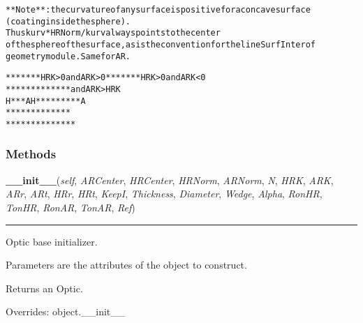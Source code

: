 \begin{alltt}
**Note**: the curvature of any surface is positive for a concave surface
(coating inside the sphere).
Thus kurv*HRNorm/{\textbar}kurv{\textbar} always points to the center
of the sphere of the surface, as is the convention for the lineSurfInter of
geometry module. Same for AR.

*******     HRK {\textgreater} 0 and ARK {\textgreater} 0     *******           HRK {\textgreater} 0 and ARK {\textless} 0
 *****                               ********         and {\textbar}ARK{\textbar} {\textgreater} {\textbar}HRK{\textbar}
 H***A                               H*********A
 *****                               ********
*******                             *******
\end{alltt}



  \subsubsection{Methods}

    \vspace{0.5ex}

\hspace{.8\funcindent}\begin{boxedminipage}{\funcwidth}

    \raggedright \textbf{\_\_init\_\_}(\textit{self}, \textit{ARCenter}, \textit{HRCenter}, \textit{HRNorm}, \textit{ARNorm}, \textit{N}, \textit{HRK}, \textit{ARK}, \textit{ARr}, \textit{ARt}, \textit{HRr}, \textit{HRt}, \textit{KeepI}, \textit{Thickness}, \textit{Diameter}, \textit{Wedge}, \textit{Alpha}, \textit{RonHR}, \textit{TonHR}, \textit{RonAR}, \textit{TonAR}, \textit{Ref})

    \vspace{-1.5ex}

    \rule{\textwidth}{0.5\fboxrule}
\setlength{\parskip}{2ex}
    Optic base initializer.

    Parameters are the attributes of the object to construct.

    Returns an Optic.

\setlength{\parskip}{1ex}
      Overrides: object.\_\_init\_\_

    \end{boxedminipage}

